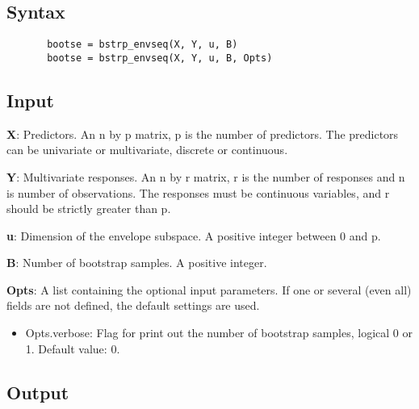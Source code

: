 \documentclass[a4paper,11pt,openany]{memoir}
\begin{document}
\subsection*{Syntax}


\begin{verbatim}       bootse = bstrp_envseq(X, Y, u, B)
       bootse = bstrp_envseq(X, Y, u, B, Opts)\end{verbatim}
    

\subsection*{Input}

\begin{par}
\textbf{X}: Predictors. An n by p matrix, p is the number of predictors. The predictors can be univariate or multivariate, discrete or continuous.
\end{par} \vspace{1em}
\begin{par}
\textbf{Y}: Multivariate responses. An n by r matrix, r is the number of responses and n is number of observations. The responses must be continuous variables, and r should be strictly greater than p.
\end{par} \vspace{1em}
\begin{par}
\textbf{u}: Dimension of the envelope subspace.  A positive integer between 0 and p.
\end{par} \vspace{1em}
\begin{par}
\textbf{B}: Number of bootstrap samples.  A positive integer.
\end{par} \vspace{1em}
\begin{par}
\textbf{Opts}: A list containing the optional input parameters. If one or several (even all) fields are not defined, the default settings are used.
\end{par} \vspace{1em}
\begin{itemize}
\setlength{\itemsep}{-1ex}
   \item Opts.verbose: Flag for print out the number of bootstrap samples, logical 0 or 1. Default value: 0.
\end{itemize}


\subsection*{Output}
\end{document}
